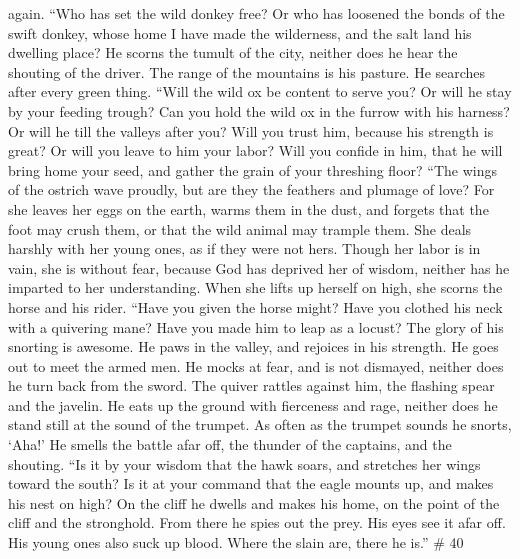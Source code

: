 again.  ``Who has set the wild donkey free? Or who has
loosened the bonds of the swift donkey,  whose home I have
made the wilderness, and the salt land his dwelling place?
 He scorns the tumult of the city, neither does he hear
the shouting of the driver.  The range of the mountains is
his pasture. He searches after every green thing.  ``Will
the wild ox be content to serve you? Or will he stay by your feeding
trough?  Can you hold the wild ox in the furrow with his
harness? Or will he till the valleys after you?  Will you
trust him, because his strength is great? Or will you leave to him your
labor?  Will you confide in him, that he will bring home
your seed, and gather the grain of your threshing floor? 
``The wings of the ostrich wave proudly, but are they the feathers and
plumage of love?  For she leaves her eggs on the earth,
warms them in the dust,  and forgets that the foot may
crush them, or that the wild animal may trample them. 
She deals harshly with her young ones, as if they were not hers. Though
her labor is in vain, she is without fear,  because God
has deprived her of wisdom, neither has he imparted to her
understanding.  When she lifts up herself on high, she
scorns the horse and his rider.  ``Have you given the
horse might? Have you clothed his neck with a quivering mane?
 Have you made him to leap as a locust? The glory of his
snorting is awesome.  He paws in the valley, and rejoices
in his strength. He goes out to meet the armed men.  He
mocks at fear, and is not dismayed, neither does he turn back from the
sword.  The quiver rattles against him, the flashing
spear and the javelin.  He eats up the ground with
fierceness and rage, neither does he stand still at the sound of the
trumpet.  As often as the trumpet sounds he snorts,
`Aha!' He smells the battle afar off, the thunder of the captains, and
the shouting.  ``Is it by your wisdom that the hawk
soars, and stretches her wings toward the south?  Is it
at your command that the eagle mounts up, and makes his nest on high?
 On the cliff he dwells and makes his home, on the point
of the cliff and the stronghold.  From there he spies out
the prey. His eyes see it afar off.  His young ones also
suck up blood. Where the slain are, there he is.'' \# 40 
